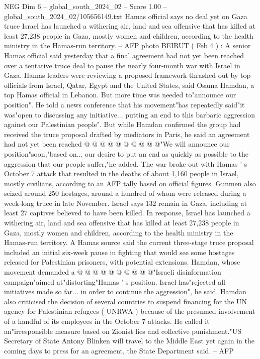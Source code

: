 \begin{textsample}{NEG Dim 6 – global\_south\_2024\_02 – Score 1.00 – global\_south\_2024\_02/105656149.txt}  \label{ex:f6_neg_274}
Hamas official says no deal yet on Gaza truce Israel has launched a withering air, land and sea offensive that has killed at least 27,238 people in Gaza, mostly women and children, according to the health ministry in the Hamas-run territory. -- AFP photo BEIRUT ( Feb 4 ) : A senior Hamas official said yesterday that a final agreement had not yet been reached over a tentative truce deal to pause the nearly four-month war with Israel in Gaza.
Hamas leaders were reviewing a proposed framework thrashed out by top officials from Israel, Qatar, Egypt and the United States, said Osama Hamdan, a top Hamas official in Lebanon.
But more time was needed to"announce our position".
He told a news conference that his movement"has repeatedly said"it was"open to discussing any initiative... putting an end to this barbaric aggression against our Palestinian people".
But while Hamdan confirmed the group had received the truce proposal drafted by mediators in Paris, he said an agreement had not yet been reached @ @ @ @ @ @ @ @ @ @"We will announce our position"soon,"based on... our desire to put an end as quickly as possible to the aggression that our people suffer,"he added.
The war broke out with Hamas ' s October 7 attack that resulted in the deaths of about 1,160 people in Israel, mostly civilians, according to an AFP tally based on official figures.
Gunmen also seized around 250 hostages, around a hundred of whom were released during a week-long truce in late November.
Israel says 132 remain in Gaza, including at least 27 captives believed to have been killed.
In response, Israel has launched a withering air, land and sea offensive that has killed at least 27,238 people in Gaza, mostly women and children, according to the health ministry in the Hamas-run territory.
A Hamas source said the current three-stage truce proposal included an initial six-week pause in fighting that would see some hostages released for Palestinian prisoners, with potential extensions.
Hamdan, whose movement demanded a @ @ @ @ @ @ @ @ @ @"Israeli disinformation campaign"aimed at"distorting"Hamas ' s position.
Israel has"rejected all initiatives made so far... in order to continue the aggression", he said.
Hamdan also criticised the decision of several countries to suspend financing for the UN agency for Palestinian refugees ( UNRWA ) because of the presumed involvement of a handful of its employees in the October 7 attacks.
He called it an"irresponsible measure based on Zionist lies and collective punishment."US Secretary of State Antony Blinken will travel to the Middle East yet again in the coming days to press for an agreement, the State Department said. -- AFP

\end{textsample}
